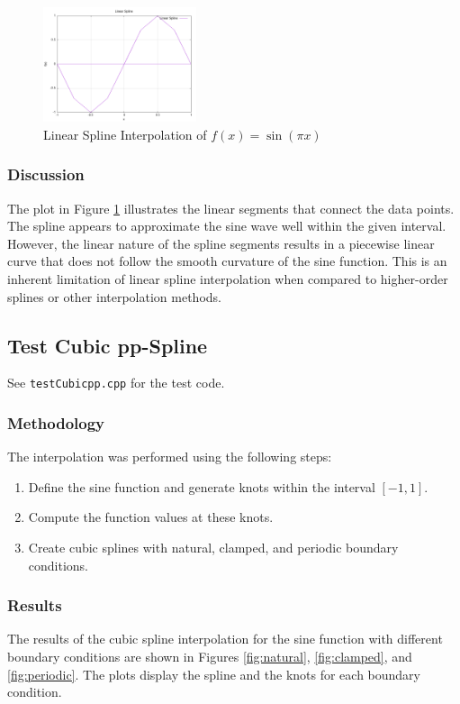 \documentclass{article}
\begin{document}
\begin{figure}[H]
    \centering
    \includegraphics[width=0.4\textwidth]{../figure/Lppspline_plot.png}
    \caption{Linear Spline Interpolation of $f(x) = \sin(\pi x)$}
    \label{fig:spline_plot}
\end{figure}

\subsubsection{Discussion}
The plot in Figure \ref{fig:spline_plot} illustrates the linear segments that connect the data points. The spline appears to approximate the sine wave well within the given interval. However, the linear nature of the spline segments results in a piecewise linear curve that does not follow the smooth curvature of the sine function. This is an inherent limitation of linear spline interpolation when compared to higher-order splines or other interpolation methods.


\subsection{Test Cubic pp-Spline}
See \texttt{testCubicpp.cpp} for the test code.
\subsubsection{Methodology}
The interpolation was performed using the following steps:
\begin{enumerate}
    \item Define the sine function and generate knots within the interval \([-1, 1]\).
    \item Compute the function values at these knots.
    \item Create cubic splines with natural, clamped, and periodic boundary conditions.
\end{enumerate}

\subsubsection{Results}
The results of the cubic spline interpolation for the sine function with different boundary conditions are shown in Figures \ref{fig:natural}, \ref{fig:clamped}, and \ref{fig:periodic}. The plots display the spline and the knots for each boundary condition.
\end{document}
